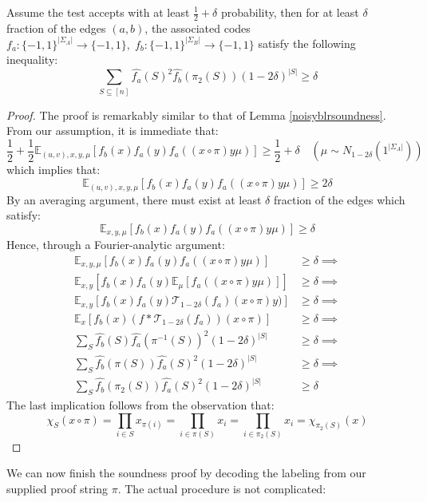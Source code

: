 \begin{lemma} \label{soundnessbound}
  Assume the test accepts with at least $\frac{1}{2} + \delta$ probability, then for at least $\delta$ fraction of the edges $(a,b)$, the associated codes $f_a:\{-1,1\}^{|\Sigma_A|} \rightarrow \{-1,1\}, \; f_b:\{-1,1\}^{|\Sigma_B|} \rightarrow \{-1,1\}$ satisfy the following inequality:
  \begin{equation}
  \sum_{S \subseteq [n]} \widehat{f_a}(S)^2\widehat{f_b}(\pi_2(S))(1-2\delta)^{|S|} \geq \delta
  \end{equation}
\end{lemma}
%
\begin{proof}
  The proof is remarkably similar to that of Lemma \ref{noisyblrsoundness}. From our assumption, it is immediate that:
  \begin{equation}
    \frac{1}{2} + \frac{1}{2}\mathbb{E}_{(u,v),x,y,\mu}\left[f_b(x)f_a(y)f_a((x \circ \pi)y\mu) \right] \geq \frac{1}{2} + \delta  \quad (\mu \sim N_{1 - 2\delta}(1^{|\Sigma_A|}))
  \end{equation}
  which implies that:
  \begin{equation}
    \mathbb{E}_{(u,v),x,y,\mu}\left[f_b(x)f_a(y)f_a((x \circ \pi)y\mu) \right] \geq 2\delta
  \end{equation}
  By an averaging argument, there must exist at least $\delta$ fraction of the edges which satisfy:
  \begin{equation}
      \mathbb{E}_{x,y,\mu}\left[f_b(x)f_a(y)f_a((x \circ \pi)y\mu) \right] \geq \delta
  \end{equation}
  Hence, through a Fourier-analytic argument:
  \begin{align*}
    \mathbb{E}_{x,y,\mu}\left[f_b(x)f_a(y)f_a((x \circ \pi)y\mu) \right] & \geq \delta \implies \\[0.7ex]
    \mathbb{E}_{x,y}\left[f_b(x)f_a(y) \mathbb{E}_{\mu} \left[f_a((x \circ \pi)y\mu) \right] \right] & \geq \delta \implies \\[0.7ex]
    \mathbb{E}_{x,y}\left[f_b(x)f_a(y) \mathcal{T}_{1-2\delta}(f_a)(x \circ \pi)y) \right] & \geq \delta \implies \\[0.7ex]
    \mathbb{E}_{x}\left[ f_b(x)(f * \mathcal{T}_{1 - 2\delta}(f_a))(x \circ \pi) \right] & \geq \delta \implies \\
    \sum_{S} \widehat{f_b}(S) \widehat{f_a}(\pi^{-1}(S))^2(1 - 2\delta)^{|S|} & \geq \delta  \implies \\
    \sum_{S} \widehat{f_b}(\pi(S))\widehat{f_a}(S)^2 (1 - 2\delta)^{|S|} & \geq \delta \implies \\
    \sum_{S} \widehat{f_b}(\pi_2(S))\widehat{f_a}(S)^2 (1 - 2\delta)^{|S|} & \geq \delta
    \end{align*}
    The last implication follows from the observation that:
    \[ \chi_S(x \circ \pi) = \prod_{i \in S} x_{\pi(i)} = \prod_{i \in \pi(S)} x_i = \prod_{i \in \pi_2(S)} x_i = \chi_{\pi_2(S)}(x) \]
\end{proof}
%
We can now finish the soundness proof by decoding the labeling from our supplied proof string $\pi$. The actual procedure is not complicated:

